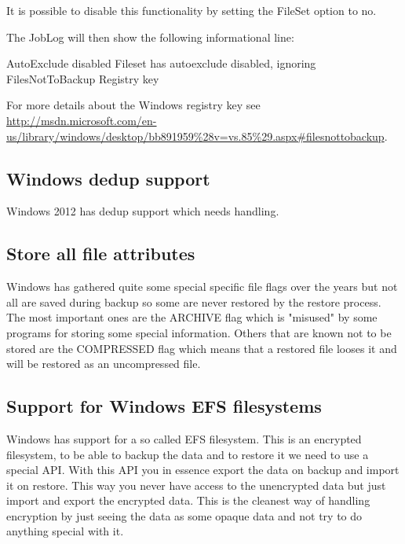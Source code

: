 It is possible to disable this functionality by setting the FileSet option  to no.

The JobLog will then show the following informational line:
\begin{bmessage}{AutoExclude disabled}
Fileset has autoexclude disabled, ignoring FilesNotToBackup Registry key
\end{bmessage}

For more details about the Windows registry key see 
\url{http://msdn.microsoft.com/en-us/library/windows/desktop/bb891959%28v=vs.85%29.aspx#filesnottobackup}.

\subsection{Windows dedup support}


   Windows 2012 has dedup support which needs handling.


\subsection{Store all file attributes}


   Windows has gathered quite some special specific file
   flags over the years but not all are saved during backup so
   some are never restored by the restore process. The most
   important ones are the ARCHIVE flag which is "misused" by
   some programs for storing some special information. Others
   that are known not to be stored are the COMPRESSED flag which
   means that a restored file looses it and will be restored as
   an uncompressed file.

\subsection{Support for Windows EFS filesystems}


  Windows has support for a so called EFS
  filesystem. This is an encrypted filesystem, to be able to backup the
  data and to restore it we need to use a special API. With this API you
  in essence export the data on backup and import it on restore. This
  way you never have access to the unencrypted data but just import and
  export the encrypted data. This is the cleanest way of handling
  encryption by just seeing the data as some opaque data and not try to
  do anything special with it.



